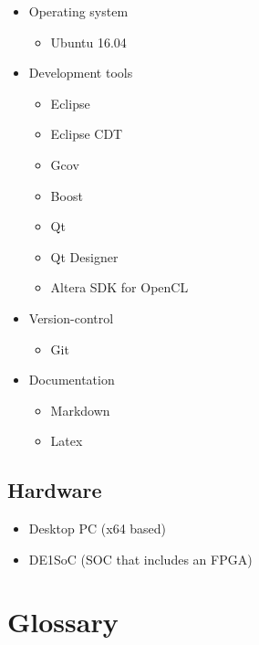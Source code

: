 \documentclass[parskip=full]{scrartcl}
\begin{document}
\begin{itemize}
	\item Operating system
	\begin{itemize}
		\item Ubuntu 16.04
	\end{itemize}
	\item Development tools
	\begin{itemize}
		\item Eclipse
		\item Eclipse CDT
		\item Gcov
		\item Boost
		\item Qt
		\item Qt Designer
		\item Altera SDK for OpenCL
	\end{itemize}
	\item Version-control
	\begin{itemize}
		\item Git
	\end{itemize}
	\item Documentation
	\begin{itemize}
		\item Markdown
		\item Latex
	\end{itemize}
\end{itemize}

\subsection {Hardware}

\begin{itemize}
	\item Desktop PC (x64 based)
	\item DE1SoC (SOC that includes an FPGA)
\end{itemize}

\pagebreak





\section{Glossary}
\end{document}
